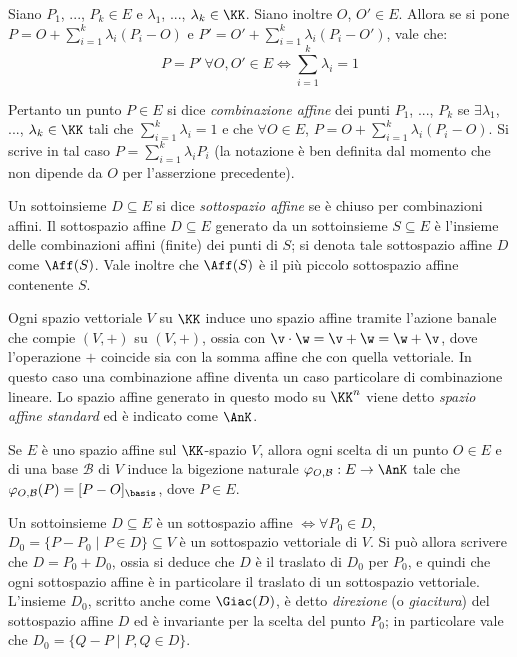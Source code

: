 \documentclass[10pt,landscape]{article}
\begin{document}
\begin{multicols}{3}
		Siano $P_1$, ..., $P_k \in E$ e $\lambda_1$, ..., $\lambda_k \in \KK$. Siano inoltre
		$O$, $O' \in E$. Allora se si pone $P=O+\sum_{i=1}^{k}\lambda_i (P_i-O)$ e $P'=O'+\sum_{i=1}^{k}\lambda_i (P_i-O')$, vale che:
		\[P=P' \, \forall O, O' \in E \iff\sum_{i=1}^{k}\lambda_i=1\]
		
		Pertanto un punto $P\in E$ si dice \textit{combinazione affine} dei punti $P_1$, ..., $P_k$ se $\exists \lambda_1$, ..., $\lambda_k \in \KK$ tali che $\sum_{i=1}^{k}\lambda_i=1$ e che $\forall O \in E$,
		$P=O+\sum_{i=1}^{k}\lambda_i (P_i-O)$. Si scrive in tal caso $P=\sum_{i=1}^{k}\lambda_i P_i$ (la notazione è ben definita dal momento che
		non dipende da $O$ per l'asserzione precedente).
		
		Un sottoinsieme $D\subseteq E$ si dice \textit{sottospazio affine} se è chiuso per combinazioni affini. Il sottospazio affine $D \subseteq E$ generato da un sottoinsieme $S \subseteq E$ è l'insieme delle combinazioni affini (finite) dei punti di $S$;
		si denota tale sottospazio affine $D$ come $\Aff(S)$. Vale inoltre che $\Aff(S)$ è il
		più piccolo sottospazio affine contenente $S$.
		        
        Ogni spazio vettoriale $V$ su $\KK$ induce uno spazio affine tramite l'azione banale che compie $(V, +)$ su $(V, +)$, ossia con $\v \cdot \w=\v+\w=\w+\v$, dove l'operazione $+$ coincide sia con la somma affine che
        con quella vettoriale.
        In questo caso una combinazione affine diventa un caso particolare di combinazione lineare. Lo spazio affine
        generato in questo modo su $\KK^n$ viene detto \textit{spazio affine standard} ed è indicato come $\AnK$. \\ \vskip 0.05in
        
        Se $E$ è uno spazio affine sul $\KK$-spazio $V$, allora ogni scelta di un punto $O \in E$ e di una base $\mathcal{B}$ di $V$ induce la bigezione naturale 
        $\varphi_{O,\mathcal{B}} : E \to \AnK$ tale che $\varphi_{O,\mathcal{B}}(P)=[P-O]_\basis$, dove $P \in E$.

        Un sottoinsieme $D \subseteq E$ è un sottospazio affine $\iff \forall P_0 \in D$,
        $D_0=\{P-P_0 \mid P\in D\}\subseteq V$ è un sottospazio vettoriale di $V$.
        Si può allora scrivere che $D=P_0+D_0$, ossia si deduce che $D$ è il traslato di $D_0$ per $P_0$, e quindi
        che ogni sottospazio affine è in particolare il traslato
        di un sottospazio vettoriale.
        L'insieme $D_0$, scritto anche come $\Giac(D)$, è detto \textit{direzione} (o \textit{giacitura}) del sottospazio affine $D$ ed è invariante per la scelta
        del punto $P_0$; in particolare vale che $D_0 = \{ Q - P \mid P, Q \in D \}$.


\end{multicols}
\end{document}
